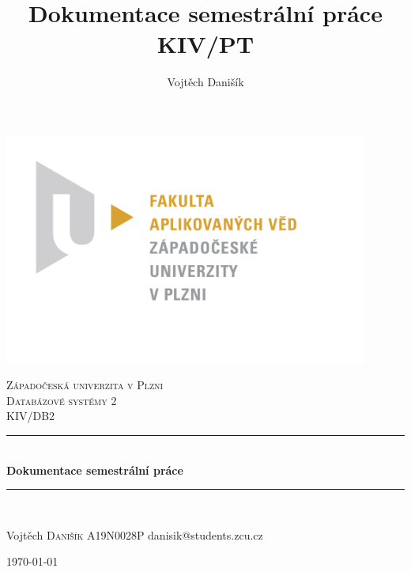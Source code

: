 \documentclass[12pt, a4paper]{article}
\title{\textbf{Dokumentace semestrální práce} \\KIV/PT}
\author{Vojtěch Danišík}
\begin{document}
\begin{titlepage} 
	\newcommand{\HRule}{\rule{\linewidth}{0.5mm}} 
	\begin{center}
	\includegraphics[width=12cm]{img/fav_logo}\\
	\end{center}
	\textsc{\LARGE Západočeská univerzita v Plzni}\\[1.5cm] 	
	\textsc{\Large Databázové systémy 2}\\[0.5cm] 
	\textsc{\large KIV/DB2}\\[0.5cm] 
	\HRule\\[0.4cm]
	{\huge\bfseries Dokumentace semestrální práce}\\[0.4cm] 
	\HRule\\[1.5cm]

	\begin{minipage}{0.4\textwidth}
		\begin{flushleft}
			\large
			Vojtěch \textsc{Danišík}\newline
			A19N0028P\newline
			danisik@students.zcu.cz
		\end{flushleft}
	\end{minipage}
	\vfill\vfill\vfill
	\begin{flushright}
	{\large\today}
	\end{flushright}
	\vfill 
\end{titlepage}
\newpage
\tableofcontents
\newpage


\end{document}
